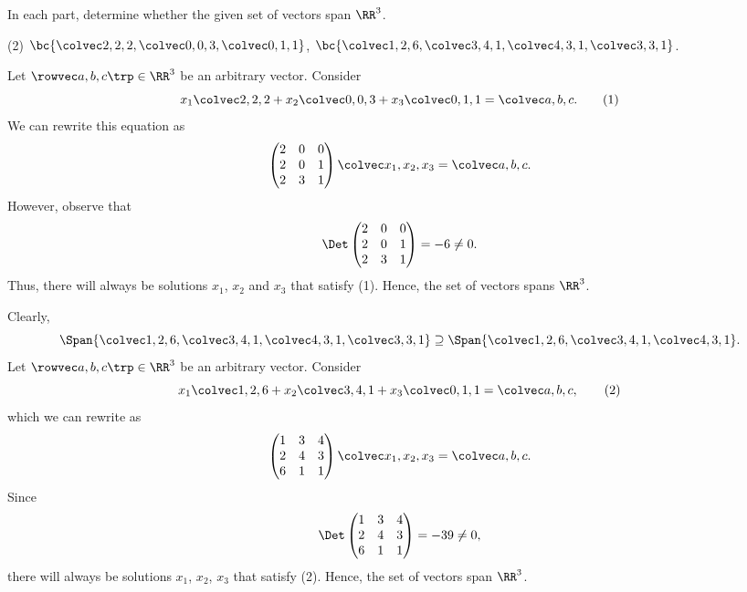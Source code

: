 \clearpage
\begin{problem}
    In each part, determine whether the given set of vectors span $\RR^3$.

    \begin{tasks}(2)
        \task $\bc{\cveciii222, \cveciii003, \cveciii011}$,
        \task $\bc{\cveciii126, \cveciii341, \cveciii431, \cveciii331}$.
    \end{tasks}
\end{problem}
\begin{solution}
    \begin{ppart}
        Let $\cveciiix{a}{b}{c} \in \RR^3$ be an arbitrary vector. Consider \[x_1 \cveciii222 + x_2 \cveciii003 + x_3 \cveciii011 = \cveciii{a}{b}{c}. \tag{1}\] We can rewrite this equation as \[\begin{pmatrix}2 & 0 & 0 \\ 2 & 0 & 1 \\ 2 & 3 & 1\end{pmatrix} \cveciii{x_1}{x_2}{x_3} = \cveciii{a}{b}{c}.\] However, observe that \[\Det \begin{pmatrix}2 & 0 & 0 \\ 2 & 0 & 1 \\ 2 & 3 & 1\end{pmatrix} = -6 \neq 0.\] Thus, there will always be solutions $x_1$, $x_2$ and $x_3$ that satisfy (1). Hence, the set of vectors spans $\RR^3$.
    \end{ppart}
    \begin{ppart}
        Clearly, \[\Span{\cveciii126, \cveciii341, \cveciii431, \cveciii331} \supseteq \Span{\cveciii126, \cveciii341, \cveciii431}.\] Let $\cveciiix{a}{b}{c} \in \RR^3$ be an arbitrary vector. Consider \[x_1 \cveciii126 + x_2 \cveciii341 + x_3 \cveciii011 = \cveciii{a}{b}{c}, \tag{2}\] which we can rewrite as \[\begin{pmatrix}1 & 3 & 4 \\ 2 & 4 & 3 \\ 6 & 1 & 1\end{pmatrix} \cveciii{x_1}{x_2}{x_3} = \cveciii{a}{b}{c}.\] Since \[\Det \begin{pmatrix}1 & 3 & 4 \\ 2 & 4 & 3 \\ 6 & 1 & 1\end{pmatrix} = -39 \neq 0,\] there will always be solutions $x_1$, $x_2$, $x_3$ that satisfy (2). Hence, the set of vectors span $\RR^3$.
    \end{ppart}
\end{solution}


